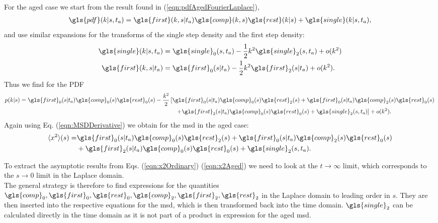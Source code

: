 For the aged case we start from the result found in (\ref{eqn:pdfAgedFourierLaplace}),
%
\begin{align}
\gls{pdf}(k|s,t_a) =  \gls{first}(k,s|t_a)  \gls{comp}(k,s) \gls{rest}(k|s) + \gls{single}(k|s,t_a) ,
\end{align}
%
and use similar expansions for the transforms of the single step density and the first step density:
%
\begin{align}
\gls{single}(k|s,t_a) &= \gls{single}_0(s,t_a) - \frac{1}{2} k^2 \gls{single}_2 (s,t_a) + o(k^2)\\ 
\gls{first}(k,s|t_a) &= \gls{first}_0(s|t_a)- \frac{1}{2} k^2 \gls{first}_2(s|t_a) + o(k^2) .
\end{align}
%
Thus we find for the \gls{PDF}
%
\begin{align}
\begin{split}
 p(k|s) = \gls{first}_0(s|t_a)\gls{comp}_0(s)\gls{rest}_0(s) - \frac{k^2}{2} &\left[ \gls{first}_0(s|t_a)\gls{comp}_0(s) \gls{rest}_2(s) +\gls{first}_0(s|t_a)\gls{comp}_2(s)\gls{rest}_0(s)  \right. \\
 & \quad \left. + \gls{first}_2(s|t_a)\gls{comp}_0(s) \gls{rest}_0(s) + \gls{single}_2(s,t_a)\right] +o(k^2) .
\end{split}
\end{align}
%
Again using Eq. (\ref{eqn:MSDDerivative}) we obtain for the \gls{msd} in the aged case:
%
\begin{align}
\mean{x^2}(s) =& \gls{first}_0(s|t_a)\gls{comp}_0(s) \gls{rest}_2(s) +\gls{first}_0(s|t_a)\gls{comp}_2(s)\gls{rest}_0(s)  \\
& + \gls{first}_2(s|t_a)\gls{comp}_0(s) \gls{rest}_0(s) + \gls{single}_2(s,t_a)  \label{eqn:x2Aged}.
\end{align}

To extract the asymptotic results from Eqs. (\ref{eqn:x2Ordinary}) (\ref{eqn:x2Aged}) we need to look at the $t \to \infty$ limit, which corresponds to the $s \to 0$ limit in the Laplace domain. \\
The general strategy is therefore to find expressions for the quantities $\gls{comp}_0, \gls{first}_0, \gls{rest}_0, \gls{comp}_2, \gls{first}_2, \gls{rest}_2$ in the Laplace domain to leading order in $s$. They are then inserted into the respective equations for the \gls{msd}, which is then transformed back into the time domain. $\gls{single}_2$ can be calculated directly in the time domain as it is not part of a product in expression for the aged \gls{msd}. 

